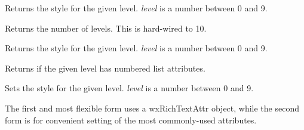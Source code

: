 
Returns the style for the given level. {\it level} is a number between 0 and 9.

\label{wxrichtextliststyledefinitiongetlevelcount}


Returns the number of levels. This is hard-wired to 10.

Returns the style for the given level. {\it level} is a number between 0 and 9.

\label{wxrichtextliststyledefinitionisnumbered}


Returns \true if the given level has numbered list attributes.

\label{wxrichtextliststyledefinitionsetlevelattributes}



Sets the style for the given level. {\it level} is a number between 0 and 9.

The first and most flexible form uses a wxRichTextAttr object, while the second form is for convenient setting of the most commonly-used attributes.

